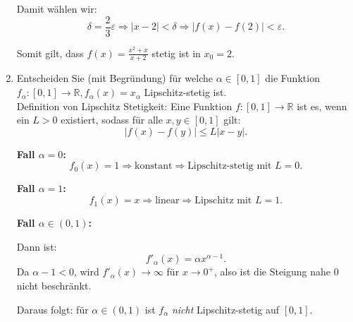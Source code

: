 \documentclass[a4paper]{article}
\begin{document}
\begin{enumerate}[label=({\alph*})]
    Damit wählen wir:
    \[
    \delta = \frac{2}{3} \varepsilon \Rightarrow |x - 2| < \delta \Rightarrow |f(x) - f(2)| < \varepsilon.
    \]
    
    Somit gilt, dass \( f(x) = \frac{x^2 + x}{x + 2} \) stetig ist in \( x_0 = 2 \).\\
    \item Entscheiden Sie (mit Begründung) für welche $\alpha\in[0,1]$ die Funktion $f_\alpha: [0,1] \to\mathbb{R}, f_\alpha(x) = x_\alpha$ Lipschitz-stetig ist.\\
    Definition von Lipschitz Stetigkeit: Eine Funktion \( f: [0, 1] \to \mathbb{R} \) ist es, wenn ein \( L > 0 \) existiert, sodass für alle \( x, y \in [0,1] \) gilt:
    \[
    |f(x) - f(y)| \leq L |x - y|.
    \]
    
    \textbf{Fall \( \alpha = 0 \):}
    \[
    f_0(x) = 1 \Rightarrow \text{konstant} \Rightarrow \text{Lipschitz-stetig mit } L = 0.
    \]
    
    \textbf{Fall \( \alpha = 1 \):}
    \[
    f_1(x) = x \Rightarrow \text{linear} \Rightarrow \text{Lipschitz mit } L = 1.
    \]
    
    \textbf{Fall \( \alpha \in (0,1) \):}
    
    Dann ist:
    \[
    f'_\alpha(x) = \alpha x^{\alpha - 1}.
    \]
    Da \( \alpha - 1 < 0 \), wird \( f'_\alpha(x) \to \infty \) für \( x \to 0^+ \), also ist die Steigung nahe 0 nicht beschränkt.
    
    Daraus folgt: für \( \alpha \in (0,1) \) ist \( f_\alpha \) \emph{nicht} Lipschitz-stetig auf \([0,1]\).
\end{enumerate}
\end{document}
